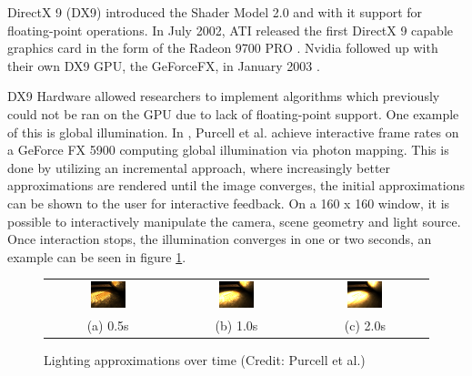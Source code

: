 DirectX 9 (DX9) introduced the Shader Model 2.0 and with it support for floating-point operations. In July 2002, ATI released the first DirectX 9 capable graphics card in the form of the Radeon 9700 PRO \cite{ati_9700_pro}. Nvidia followed up with their own DX9 GPU, the GeForceFX, in January 2003 \cite{geforcefx}.

DX9 Hardware allowed researchers to implement algorithms which previously could not be ran on the GPU due to lack of floating-point support. One example of this is global illumination. In \cite{photon_mapping_gpgpu}, Purcell et al. achieve interactive frame rates on a GeForce FX 5900 computing global illumination via photon mapping. This is done by utilizing an incremental approach, where increasingly better approximations are rendered until the image converges, the initial approximations can be shown to the user for interactive feedback. On a 160 x 160 window, it is possible to interactively manipulate the camera, scene geometry and light source. Once interaction stops, the illumination converges in one or two seconds, an example can be seen in figure \ref{fig:lighting-approximations}.

\begin{figure}[ht]
    \centering
    \begin{tabular}{ccc}
        \includegraphics[width=0.3\textwidth]{img/half-second-glass-ball.png} & \includegraphics[width=0.3\textwidth]{img/one-second-glass-ball.png} & \includegraphics[width=0.3\textwidth]{img/two-second-glass-ball.png} \\
        (a) 0.5s                                                              & (b) 1.0s                                                             & (c) 2.0s
    \end{tabular}
    \captionsetup{justification=centering}
    \caption{Lighting approximations over time (Credit: Purcell et al.)}
    \label{fig:lighting-approximations}
\end{figure}

